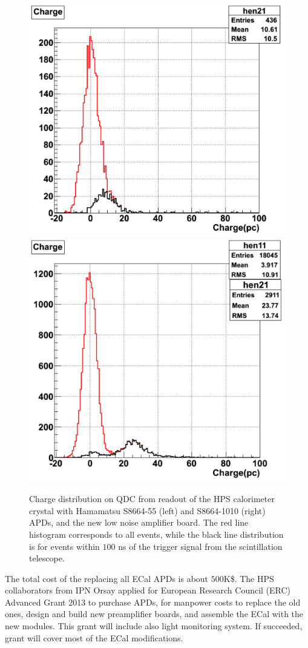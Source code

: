 \begin{figure}[t]
\includegraphics[scale=0.37]{ecal/MIP_5x5_APD.png}
\includegraphics[scale=0.37]{ecal/MIP_10x10_APD.png}
\caption{\small{Charge distribution on QDC from readout of the HPS calorimeter crystal with Hamamatsu S8664-55 (left) and S8664-1010 (right) APDs, and the new low noise amplifier board. The red line histogram corresponds to all events, while the black line distribution is for events within $100$ ns of the trigger signal from the scintillation telescope.}}\label{fig:mip10x10}
\end{figure}

The total cost of the replacing all ECal APDs is about $500$K\$. The HPS collaborators from IPN Orsay applied for  European Research Council (ERC) Advanced Grant 2013 to purchase APDs, for manpower costs to replace the old ones, design and build new preamplifier boards, and assemble the ECal with the new modules. This grant will include also light monitoring system. If succeeded, grant will cover most of the ECal modifications. 

